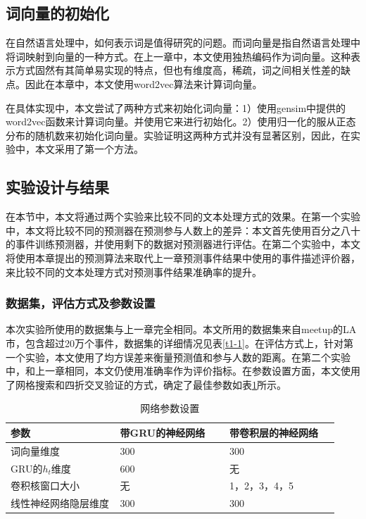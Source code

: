 \subsection{词向量的初始化}
在自然语言处理中，如何表示词是值得研究的问题。而词向量是指自然语言处理中将词映射到向量的一种方式。在上一章中，本文使用独热编码作为词向量。这种表示方式固然有其简单易实现的特点，但也有维度高，稀疏，词之间相关性差的缺点。因此在本章中，本文使用word2vec\cite{word2vec}算法来计算词向量。

在具体实现中，本文尝试了两种方式来初始化词向量：1）使用gensim中提供的word2vec函数来计算词向量。并使用它来进行初始化。2）使用归一化的服从正态分布的随机数来初始化词向量。实验证明这两种方式并没有显著区别，因此，在实验中，本文采用了第一个方法。
\subsection{实验设计与结果}
在本节中，本文将通过两个实验来比较不同的文本处理方式的效果。在第一个实验中，本文将比较不同的预测器在预测参与人数上的差异：本文首先使用百分之八十的事件训练预测器，并使用剩下的数据对预测器进行评估。在第二个实验中，本文将使用本章提出的预测算法来取代上一章预测事件结果中使用的事件描述评价器，来比较不同的文本处理方式对预测事件结果准确率的提升。
\subsubsection{数据集，评估方式及参数设置}
本次实验所使用的数据集与上一章完全相同。本文所用的数据集来自meetup的LA市，包含超过20万个事件，数据集的详细情况见表\ref{t1-1}。在评估方式上，针对第一个实验，本文使用了均方误差来衡量预测值和参与人数的距离。在第二个实验中，和上一章相同，本文仍使用准确率作为评价指标。在参数设置方面，本文使用了网格搜索和四折交叉验证的方式，确定了最佳参数如表\ref{t2-1}所示。

\begin{table}[htb]
\caption{\label{t2-1}网络参数设置}
\centering
\begin{tabular*}{\linewidth}{p{0.333\linewidth}p{0.333\linewidth}p{0.333\linewidth}}
\toprule
    参数         & 带GRU的神经网络 & 带卷积层的神经网络 \\
\midrule
    词向量维度      & 300       & 300       \\
    GRU的\(h_t\)维度   & 600       & 无         \\
    卷积核窗口大小    & 无         & 1，2，3，4，5 \\
    线性神经网络隐层维度 & 300       & 300      \\ 
\bottomrule
\end{tabular*}
\end{table}

